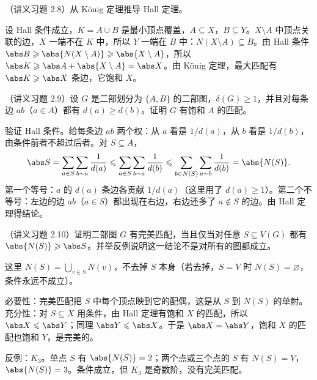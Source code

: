 \begin{workedexample}\label{we:hall-condition:from-konig}
（讲义习题 2.8）从 König 定理推导 Hall 定理。
\end{workedexample}
\begin{solution}
设 Hall 条件成立，$K=A\cup B$ 是最小顶点覆盖，$A\subseteq X$，$B\subseteq Y$。$X\setminus A$ 中顶点关联的边，$X$ 一端不在 $K$ 中，所以 $Y$ 一端在 $B$ 中：$N(X\setminus A)\subseteq B$。由 Hall 条件 $\abs B\geqslant\abs{N(X\setminus A)}\geqslant\abs{X\setminus A}$，所以 $\abs K\geqslant\abs A+\abs{X\setminus A}=\abs X$。由 König 定理，最大匹配有 $\abs K\geqslant\abs X$ 条边，它饱和 $X$。
\end{solution}

\begin{workedexample}\label{we:hall-condition:degree-weights}
（讲义习题 2.9）设 $G$ 是二部划分为 $\{A,B\}$ 的二部图，$\delta(G)\geqslant1$，并且对每条边 $ab$（$a\in A$）都有 $d(a)\geqslant d(b)$。证明 $G$ 有饱和 $A$ 的匹配。
\end{workedexample}
\begin{solution}
验证 Hall 条件。给每条边 $ab$ 两个权：从 $a$ 看是 $1/d(a)$，从 $b$ 看是 $1/d(b)$，由条件前者不超过后者。对 $S\subseteq A$，
\[
\abs S=\sum_{a\in S}\sum_{b\sim a}\frac1{d(a)}\leqslant\sum_{a\in S}\sum_{b\sim a}\frac1{d(b)}\leqslant\sum_{b\in N(S)}\sum_{a\sim b}\frac1{d(b)}=\abs{N(S)} .
\]
第一个等号：$a$ 的 $d(a)$ 条边各贡献 $1/d(a)$（这里用了 $d(a)\geqslant1$）。第二个不等号：左边的边 $ab$（$a\in S$）都出现在右边，右边还多了 $a\notin S$ 的边。由 Hall 定理得结论。
\end{solution}

\begin{workedexample}\label{we:hall-condition:perfect}
（讲义习题 2.10）证明二部图 $G$ 有完美匹配，当且仅当对任意 $S\subseteq V(G)$ 都有 $\abs{N(S)}\geqslant\abs S$。并举反例说明这一结论不是对所有的图都成立。
\end{workedexample}
\begin{solution}
这里 $N(S)=\bigcup_{v\in S}N(v)$，不去掉 $S$ 本身（若去掉，$S=V$ 时 $N(S)=\varnothing$，条件永远不成立）。

必要性：完美匹配把 $S$ 中每个顶点映到它的配偶，这是从 $S$ 到 $N(S)$ 的单射。充分性：对 $S\subseteq X$ 用条件，由 Hall 定理有饱和 $X$ 的匹配，所以 $\abs X\leqslant\abs Y$；同理 $\abs Y\leqslant\abs X$。于是 $\abs X=\abs Y$，饱和 $X$ 的匹配也饱和 $Y$，是完美的。

反例：$K_3$。单点 $S$ 有 $\abs{N(S)}=2$；两个点或三个点的 $S$ 有 $N(S)=V$，$\abs{N(S)}=3$。条件成立，但 $K_3$ 是奇数阶，没有完美匹配。
\end{solution}

